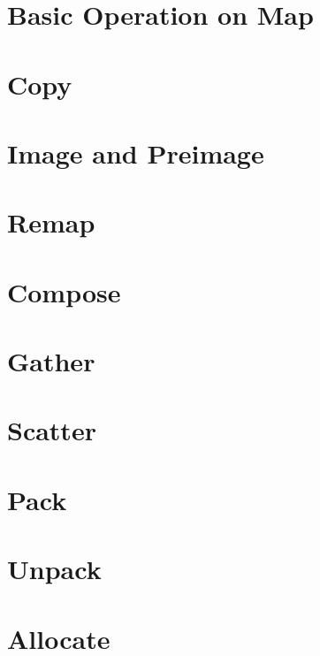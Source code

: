 \documentclass[10pt,epsf]{book}
\begin{document}
\section { Basic Operation on Map }


\section { Copy }
\section { Image and Preimage }
\section { Remap }
\section { Compose }
\section { Gather }
\section { Scatter }
\section { Pack  }
\section { Unpack }
\section { Allocate }
\end{document}
